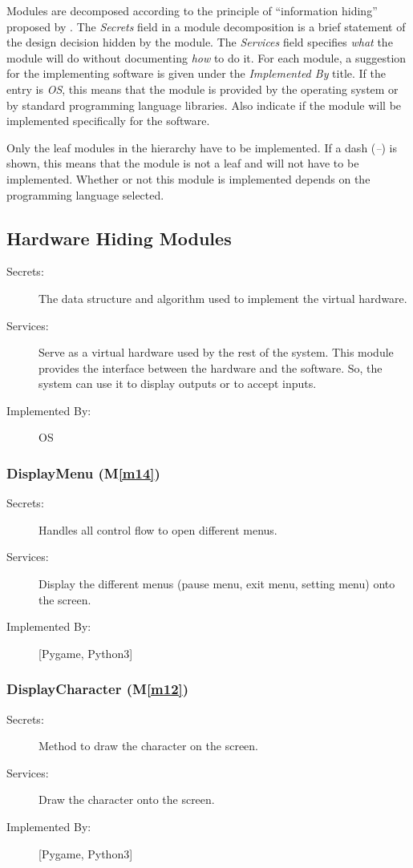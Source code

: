 \documentclass[12pt, titlepage]{article}
\newcommand{\mref}[1]{M\ref{#1}}
\begin{document}
Modules are decomposed according to the principle of ``information hiding''
proposed by \citet{ParnasEtAl1984}. The \emph{Secrets} field in a module
decomposition is a brief statement of the design decision hidden by the
module. The \emph{Services} field specifies \emph{what} the module will do
without documenting \emph{how} to do it. For each module, a suggestion for the
implementing software is given under the \emph{Implemented By} title. If the
entry is \emph{OS}, this means that the module is provided by the operating
system or by standard programming language libraries.  Also indicate if the
module will be implemented specifically for the software.

Only the leaf modules in the
hierarchy have to be implemented. If a dash (\emph{--}) is shown, this means
that the module is not a leaf and will not have to be implemented. Whether or
not this module is implemented depends on the programming language
selected.

\subsection{Hardware Hiding Modules}
\begin{description}
\item[Secrets:]The data structure and algorithm used to implement the virtual
  hardware.
\item[Services:]Serve as a virtual hardware used by the rest of the
  system. This module provides the interface between the hardware and the
  software. So, the system can use it to display outputs or to accept inputs.
\item[Implemented By:] OS
\end{description}


\subsubsection{DisplayMenu (\mref{m14})}
\begin{description}
\item[Secrets:] Handles all control flow to open different menus. 
\item[Services:] Display the different menus (pause menu, exit menu, setting menu) onto the screen.
\item[Implemented By:] [Pygame, Python3]
\end{description}

\subsubsection{DisplayCharacter (\mref{m12})}
\begin{description}
\item[Secrets:] Method to draw the character on the screen.
\item[Services:] Draw the character onto the screen.
\item[Implemented By:] [Pygame, Python3]
\end{description}
\end{document}
